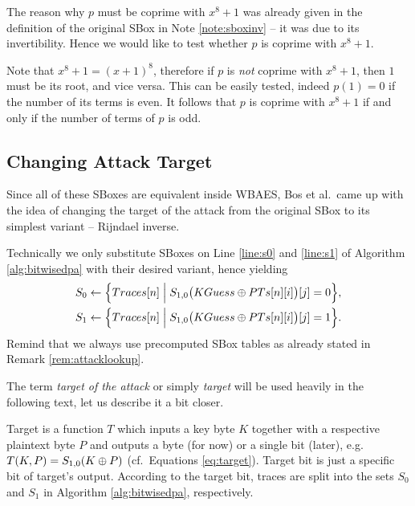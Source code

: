\begin{remark}
\label{rem:coprime}
	The reason why $p$ must be coprime with $x^8+1$ was already given in the definition of the original SBox in Note \ref{note:sboxinv} -- it was due to its invertibility. Hence we would like to test whether $p$ is coprime with $x^8+1$.
	
	Note that $x^8+1 = (x+1)^8$, therefore if $p$ is {\em not} coprime with $x^8+1$, then $1$ must be its root, and vice versa. This can be easily tested, indeed $p(1) = 0$ if the number of its terms is even. It follows that $p$ is coprime with $x^8+1$ if and only if the number of terms of $p$ is odd.
\end{remark}



\subsection{Changing Attack Target}
\label{sec:rijinv}

Since all of these SBoxes are equivalent inside WBAES, Bos et al.\ came up with the idea of changing the target of the attack from the original SBox to its simplest variant -- Rijndael inverse.

\begin{remark}
\label{rem:spq}
	Technically we only substitute SBoxes on Line \ref{line:s0} and \ref{line:s1} of Algorithm \ref{alg:bitwisedpa} with their desired variant, hence yielding
	\begin{align}
	\begin{split}
	\label{eq:target}
		S_0 &\gets \Bigl\{ Traces[n] \Bigm| S_{1,0}\bigl(KGuess\oplus PTs[n][i]\bigr)[j] = 0 \Bigr\} , \\
		S_1 &\gets \Bigl\{ Traces[n] \Bigm| S_{1,0}\bigl(KGuess\oplus PTs[n][i]\bigr)[j] = 1 \Bigr\} .
	\end{split}
	\end{align}
	Remind that we always use precomputed SBox tables as already stated in Remark \ref{rem:attacklookup}.
\end{remark}

\begin{note}
\label{note:target}
	The term {\em target of the attack} or simply {\em target} will be used heavily in the following text, let us describe it a bit closer.   %
	
	Target is a function $T$ which inputs a key byte $K$ together with a respective plaintext byte $P$ and outputs a byte (for now) or a single bit (later), e.g.\ $T(K,P) = S_{1,0}(K\oplus P)$ (cf.\ Equations \ref{eq:target}). Target bit is just a specific bit of target's output. According to the target bit, traces are split into the sets $S_0$ and $S_1$ in Algorithm \ref{alg:bitwisedpa}, respectively.
\end{note}

